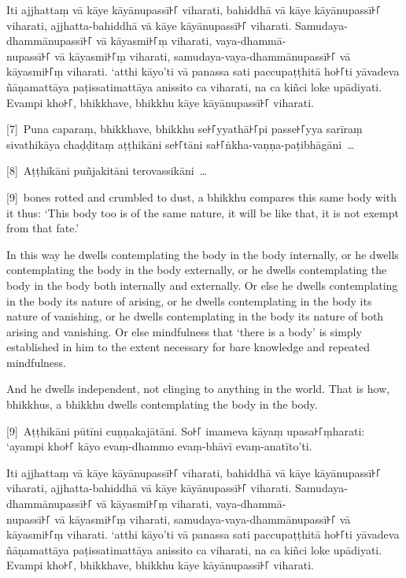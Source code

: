 Iti ajjhattaṃ vā kāye kāyānupassī꜔꜒ viharati, bahiddhā vā kāye kāyānupassī꜔꜒
viharati, ajjhatta-bahiddhā vā kāye kāyānupassī꜔꜒ viharati. Samudaya-dhammānupassī꜔꜒
vā kāyasmi꜔꜒ṃ viharati, vaya-dhammā-\\
nupassī꜔꜒ vā kāyasmi꜔꜒ṃ viharati, samudaya-vaya-dhammānupassī꜔꜒ vā kāyasmi꜔꜒ṃ viharati.
‘atthi kāyo’ti vā panassa sati paccupaṭṭhitā ho꜔꜒ti yāvadeva ñāṇamattāya
paṭissatimattāya anissito ca viharati, na ca kiñci loke upādiyati. Evampi kho꜔꜒,
bhikkhave, bhikkhu kāye kāyānupassī꜔꜒ viharati.

[7]~Puna caparaṃ, bhikkhave, bhikkhu se꜔꜒yyathā꜔꜒pi passe꜔꜒yya sarīraṃ sivathikāya
chaḍḍitaṃ aṭṭhikāni se꜔꜒tāni sa꜔꜒ṅkha-vaṇṇa-paṭibhāgāni~\ldots{}

[8]~Aṭṭhikāni puñjakitāni terovassikāni~\ldots{}

\englishPage

[9]~bones rotted and crumbled to dust, a bhikkhu compares this same
body with it thus: ‘This body too is of the same nature, it will be like that,
it is not exempt from that fate.’

In this way he dwells contemplating the body in the body internally, or he
dwells contemplating the body in the body externally, or he dwells contemplating
the body in the body both internally and externally. Or else he dwells
contemplating in the body its nature of arising, or he dwells contemplating in
the body its nature of vanishing, or he dwells contemplating in the body its
nature of both arising and vanishing. Or else mindfulness that ‘there is a body’
is simply established in him to the extent necessary for bare knowledge and
repeated mindfulness.

And he dwells independent, not clinging to anything in the world. That is how,
bhikkhus, a bhikkhu dwells contemplating the body in the body.



\paliPage

[9]~Aṭṭhikāni pūtīni cuṇṇakajātāni. So꜔꜒ imameva kāyaṃ upasa꜔꜒ṃharati: ‘ayampi kho꜔꜒
kāyo evaṃ-dhammo evaṃ-bhāvī evaṃ-anatīto’ti.

Iti ajjhattaṃ vā kāye kāyānupassī꜔꜒ viharati, bahiddhā vā kāye kāyānupassī꜔꜒
viharati, ajjhatta-bahiddhā vā kāye kāyānupassī꜔꜒ viharati. Samudaya-dhammānupassī꜔꜒
vā kāyasmi꜔꜒ṃ viharati, vaya-dhammā-\\
nupassī꜔꜒ vā kāyasmi꜔꜒ṃ viharati, samudaya-vaya-dhammānupassī꜔꜒ vā kāyasmi꜔꜒ṃ viharati.
‘atthi kāyo’ti vā panassa sati paccupaṭṭhitā ho꜔꜒ti yāvadeva ñāṇamattāya
paṭissatimattāya anissito ca viharati, na ca kiñci loke upādiyati. Evampi kho꜔꜒,
bhikkhave, bhikkhu kāye kāyānupassī꜔꜒ viharati.

